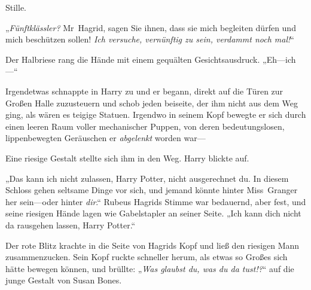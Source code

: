 Stille.

„\emph{Fünftklässler?} Mr~Hagrid, sagen Sie ihnen, dass sie mich begleiten dürfen und mich beschützen sollen! \emph{Ich versuche, vernünftig zu sein, verdammt noch mal!}“

Der Halbriese rang die Hände mit einem gequälten Gesichtsausdruck.
„Eh—ich—“

Irgendetwas schnappte in Harry zu und er begann, direkt auf die Türen zur Großen Halle zuzusteuern und schob jeden beiseite, der ihm nicht aus dem Weg ging, als wären es teigige Statuen. Irgendwo in seinem Kopf bewegte er sich durch einen leeren Raum voller mechanischer Puppen, von deren bedeutungslosen, lippenbewegten Geräuschen er \emph{abgelenkt} worden war—


Eine riesige Gestalt stellte sich ihm in den Weg. Harry blickte auf.

„Das kann ich nicht zulassen, Harry Potter, nicht ausgerechnet du. In diesem Schloss gehen seltsame Dinge vor sich, und jemand könnte hinter Miss~Granger her sein—oder hinter \emph{dir}.“
Rubeus Hagrids Stimme war bedauernd, aber fest, und seine riesigen Hände lagen wie Gabelstapler an seiner Seite.
„Ich kann dich nicht da rausgehen lassen, Harry Potter.“


Der rote Blitz krachte in die Seite von Hagrids Kopf und ließ den riesigen Mann zusammenzucken. Sein Kopf ruckte schneller herum, als etwas so Großes sich hätte bewegen können, und brüllte: „\emph{Was glaubst du, was du da tust!?}“ auf die junge Gestalt von Susan Bones.

